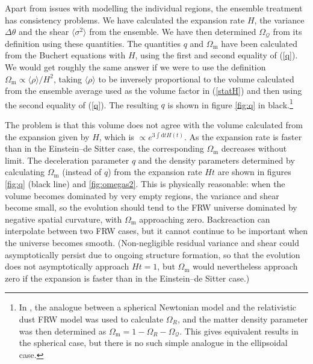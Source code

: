 \documentclass[11pt, a4paper]{article}
\newcommand{\re}[1]{(\ref{#1})}
\newcommand{\fig}[1]{figure \ref{#1}}
\newcommand{\rmd}{\mathrm{d}}
\newcommand{\av}[1]{\langle{#1}\rangle}
\newcommand{\sQ}{\mathcal{Q}}
\newcommand{\Om}{\Omega_{\mathrm{m}}}
\newcommand{\OQ}{\Omega_{\sQ}}
\newcommand{\OR}{\Omega_{R}}
\begin{document}
Apart from issues with modelling the individual regions, the ensemble treatment has consistency problems. We have calculated the expansion rate $H$, the variance $\Delta\theta$ and the shear $\av{\sigma^2}$ from the ensemble. We have then determined $\OQ$ from its definition using these quantities. The quantities $q$ and $\Om$ have been calculated from the Buchert equations with $H$, using the first and second equality of \re{q}. We would get roughly the same answer if we were to use the definition $\Om\propto\av{\rho}/H^2$, taking $\av{\rho}$ to be inversely proportional to the volume calculated from the ensemble average used as the volume factor in \re{statH} and then using the second equality of \re{q}. The resulting $q$ is shown in \fig{fig:q} in black.\footnote{In \cite{Rasanen:2008it}, the analogue between a spherical Newtonian model and the relativistic dust FRW model was used to calculate $\OR$, and the matter density parameter was then determined as $\Om=1-\OR-\OQ$. This gives equivalent results in the spherical case, but there is no such simple analogue in the ellipsoidal case.}

The problem is that this volume does not agree with the volume
calculated from the expansion given by $H$, which is
$\propto e^{3\int\rmd t H(t)}$. As the expansion rate is faster than
in the Einstein--de Sitter case, the corresponding $\Om$ decreases
without limit. The deceleration parameter $q$ and the density
parameters determined by calculating $\Om$ (instead of $q$) from the
expansion rate $Ht$ are shown in figures \ref{fig:q} (black line) and
\ref{fig:omegas2}.  This is physically reasonable: when the volume
becomes dominated by very empty regions, the variance and shear become
small, so the evolution should tend to the FRW universe dominated by
negative spatial curvature, with $\Om$ approaching zero. Backreaction
can interpolate between two FRW cases, but it cannot continue to be
important when the universe becomes smooth. (Non-negligible residual
variance and shear could asymptotically persist due to ongoing
structure formation, so that the evolution does not asymptotically
approach $Ht=1$, but $\Om$ would nevertheless approach zero if the
expansion is faster than in the Einstein--de Sitter case.)
\end{document}
